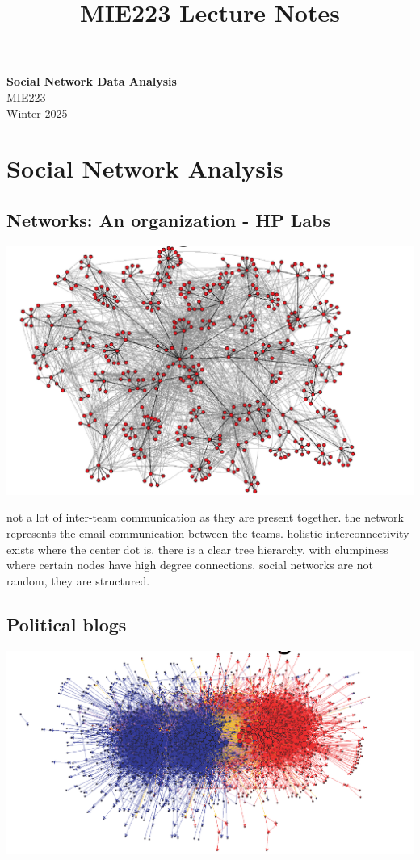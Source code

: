 \documentclass[11pt]{article}
\theoremstyle{definition}
\begin{document}
\setcounter{section}{0}
\title{MIE223 Lecture Notes}

\thispagestyle{empty}

\begin{center}
{\LARGE \bf Social Network Data Analysis}\\
{\large MIE223}\\
Winter 2025
\end{center}
\section{Social Network Analysis}
\subsection{Networks: An organization - HP Labs}
\includegraphics[width=\textwidth/2]{1.png}

not a lot of inter-team communication as they are present together.
the network represents the email communication between the teams.
holistic interconnectivity exists where the center dot is.
there is a clear tree hierarchy, with clumpiness where certain nodes
have high degree connections. social networks are not random, they are
structured.

\subsection{Political blogs}
\includegraphics[width=\textwidth/2]{2.png}
\end{document}
